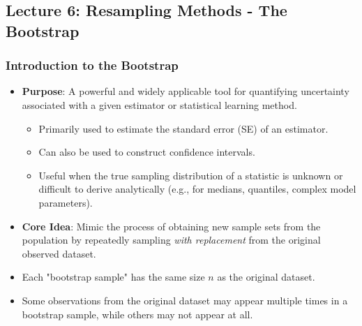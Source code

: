 \documentclass[12pt,a4paper]{article}
\begin{document}
\begin{itemize}
\begin{itemize}
\begin{itemize}
\subsection{Lecture 6: Resampling Methods - The Bootstrap}
    \subsubsection{Introduction to the Bootstrap}
        \begin{itemize}
            \item \textbf{Purpose}: A powerful and widely applicable tool for quantifying uncertainty associated with a given estimator or statistical learning method.
                \begin{itemize}
                    \item Primarily used to estimate the standard error (SE) of an estimator.
                    \item Can also be used to construct confidence intervals.
                    \item Useful when the true sampling distribution of a statistic is unknown or difficult to derive analytically (e.g., for medians, quantiles, complex model parameters).
                \end{itemize}
            \item \textbf{Core Idea}: Mimic the process of obtaining new sample sets from the population by repeatedly sampling \textit{with replacement} from the original observed dataset.
            \item Each "bootstrap sample" has the same size $n$ as the original dataset.
            \item Some observations from the original dataset may appear multiple times in a bootstrap sample, while others may not appear at all.
        \end{itemize}


\end{itemize}
\end{itemize}
\end{itemize}
\end{document}
